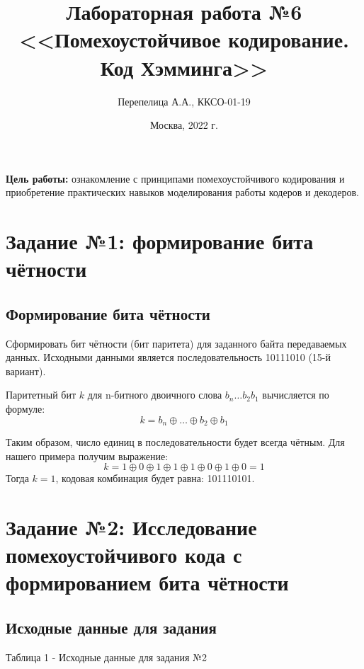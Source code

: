 \documentclass[11pt]{article}
\title{\textbf{Лабораторная работа №6\\<<Помехоустойчивое кодирование. Код Хэмминга>>}}
\author{Перепелица А.А., ККСО-01-19}
\date{Москва, 2022 г.}
\begin{document}
\maketitle
\thispagestyle{empty}
\textbf{Цель работы:}  ознакомление с принципами помехоустойчивого кодирования и приобретение практических навыков моделирования работы кодеров и декодеров. 

\section{Задание №1: формирование бита чётности}

\subsection{Формирование бита чётности}
Сформировать бит чётности (бит паритета) для заданного байта передаваемых данных. Исходными данными является последовательность 10111010 (15-й вариант).

Паритетный бит $k$ для n-битного двоичного слова $b_n \ldots b_2 b_1$ вычисляется по формуле:
$$
k=b_n \oplus \ldots \oplus b_2 \oplus b_1
$$

Таким образом, число единиц в последовательности будет всегда чётным. Для нашего примера получим выражение:
$$
k= 1 \oplus 0 \oplus 1\oplus 1\oplus 1\oplus 0\oplus 1\oplus 0 = 1
$$
Тогда $k=1$, кодовая комбинация будет равна: 101110101.

\newpage

\section{Задание №2: Исследование помехоустойчивого кода с формированием бита чётности}

\subsection{Исходные данные для задания}

\begin{table}[h]
    \end{table}
\begin{center}
    Таблица 1 - Исходные данные для задания №2
\end{center}
\end{document}
